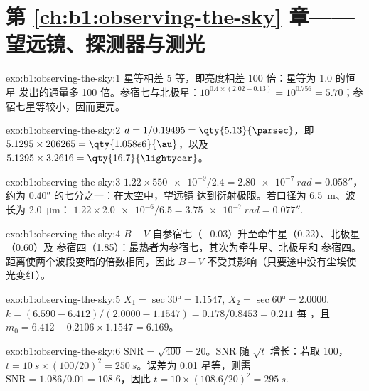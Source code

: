 \section*{第 \ref{ch:b1:observing-the-sky} 章——望远镜、探测器与测光}

\begin{solution}{exo:b1:observing-the-sky:1}
星等相差 5 等，即亮度相差 100 倍：星等为 1.0 的恒星
发出的通量多 100 倍。参宿七与北极星：$10^{0.4\times(2.02 - 0.13)} =
10^{0.756} = 5.70$；参宿七星等较小，因而更亮。
\end{solution}

\begin{solution}{exo:b1:observing-the-sky:2}
$d = 1/0.19495 = \qty{5.13}{\parsec}$，即 $5.1295\times206265 =
\qty{1.058e6}{\au}$，以及 $5.1295\times3.2616 = \qty{16.7}{\lightyear}$。
\end{solution}

\begin{solution}{exo:b1:observing-the-sky:3}
$1.22\times\num{550e-9}/2.4 = \qty{2.80e-7}{rad} = \ang{;;0.058}$，
约为 \ang{;;0.40} 的七分之一：在太空中，望远镜
达到衍射极限。若口径为 \qty{6.5}{m}、波长为 \qty{2.0}{\micro\metre}：
$1.22\times\num{2.0e-6}/6.5 = \qty{3.75e-7}{rad} = \ang{;;0.077}$.
\end{solution}

\begin{solution}{exo:b1:observing-the-sky:4}
$B - V$ 自参宿七（$-0.03$）升至牵牛星（0.22）、北极星（0.60）及
参宿四（1.85）：最热者为参宿七，其次为牵牛星、北极星和
参宿四。距离使两个波段变暗的倍数相同，因此 $B - V$
不受其影响（只要途中没有尘埃使光变红）。
\end{solution}

\begin{solution}{exo:b1:observing-the-sky:5}
$X_1 = \sec\ang{30} = 1.1547$, $X_2 = \sec\ang{60} = 2.0000$.
$k = (6.590 - 6.412)/(2.0000 - 1.1547) = 0.178/0.8453 = \num{0.211}$ 每
，且 $m_0 = 6.412 - 0.2106\times1.1547 = 6.169$。
\end{solution}

\begin{solution}{exo:b1:observing-the-sky:6}
$\mathrm{SNR} = \sqrt{400} = 20$。SNR 随 $\sqrt t$ 增长：若取 100，
$t = \qty{10}{s}\times(100/20)^2 = \qty{250}{s}$。误差为 \num{0.01}
星等，则需 $\mathrm{SNR} = 1.086/0.01 = 108.6$，因此
$t = 10\times(108.6/20)^2 = \qty{295}{s}$.
\end{solution}

